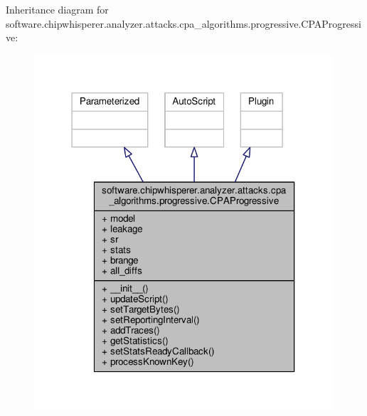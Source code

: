 Inheritance diagram for software.\+chipwhisperer.\+analyzer.\+attacks.\+cpa\+\_\+algorithms.\+progressive.\+C\+P\+A\+Progressive\+:\nopagebreak
\begin{figure}[H]
\begin{center}
\leavevmode
\includegraphics[width=315pt]{dc/d89/classsoftware_1_1chipwhisperer_1_1analyzer_1_1attacks_1_1cpa__algorithms_1_1progressive_1_1CPAProgressive__inherit__graph}
\end{center}
\end{figure}


